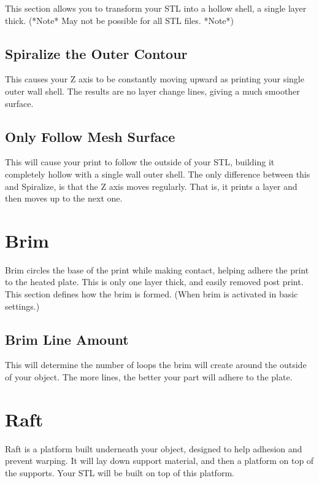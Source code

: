 This section allows you to transform your STL into a hollow shell, a single layer thick. (*Note* May not be possible for all STL files. *Note*)

\subsection{Spiralize the Outer Contour}

This causes your Z axis to be constantly moving upward as printing your single outer wall shell. The results are no layer change lines, giving a much smoother surface.

\subsection{Only Follow Mesh Surface}

This will cause your print to follow the outside of your STL, building it completely hollow with a single wall outer shell. The only difference between this and Spiralize, is that the Z axis moves regularly. That is, it prints a layer and then moves up to the next one.

\section{Brim}

Brim circles the base of the print while making contact, helping adhere the print to the heated plate. This is only one layer thick, and easily removed post print. This section defines how the brim is formed. (When brim is activated in basic settings.)

\subsection{Brim Line Amount}
This will determine the number of loops the brim will create around the outside of your object. The more lines, the better your part will adhere to the plate. 

\section{Raft}

Raft is a platform built underneath your object, designed to help adhesion and prevent warping. It will lay down support material, and then a platform on top of the supports. Your STL will be built on top of this platform. 

